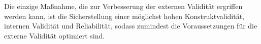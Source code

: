 Die einzige Maßnahme, die zur Verbesserung der externen Validität ergriffen werden kann, ist die Sicherstellung einer möglichst hohen Konstruktvalidität, internen Validität und Reliabilität, sodass zumindest die Voraussetzungen für die externe Validität optimiert sind.

%
%
%
%
%
%
%
%